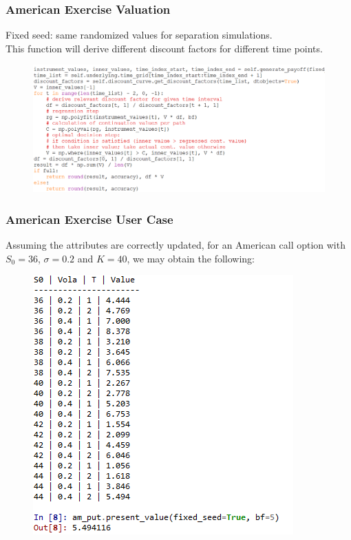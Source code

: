 \documentclass{beamer}
\begin{document}
\begin{frame}
\frametitle{American Exercise Valuation}
Fixed seed: same randomized values for separation simulations.\\
This function will derive different discount factors for different time points.
\begin{figure}[H]
	\includegraphics[scale=0.4]{american_present_value.png}
\end{figure}
\end{frame}

\begin{frame}
\frametitle{American Exercise User Case}
Assuming the attributes are correctly updated, for an American call option with $S_{0} = 36$, $\sigma = 0.2$ and $K = 40$, we may obtain the following:
\begin{figure}[H]
	\includegraphics[scale=0.6]{american_exercise_user_case.png}
\end{figure}
\end{frame}
\end{document}
